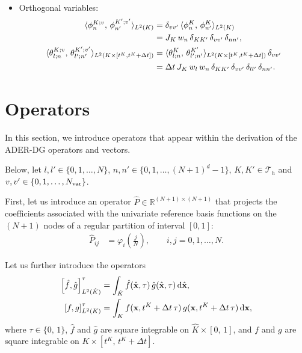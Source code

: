 \documentclass{scrreprt}
\theoremstyle{definition}
\theoremstyle{nonumberplain}
\renewcommand{\vec}[1]{{\textbf{#1}}}
\newcommand{\tria}{\mathcal{T}_h}
\newcommand{\cell}{K}
\newcommand{\dV}{\text{d}\vec{x}}
\newcommand{\refVec}[1]{\hat{\vec{#1}}}
\newcommand{\refCell}{\hat{\cell}}
\newcommand{\detJ}{J_\cell}
\newcommand{\refdV}{\textup{d}\hat{\vec{x}}}
\begin{document}
\begin{itemize}
\item Orthogonal variables:
\begin{align}
\label{eq:ader_impl:basis:orthogonal_variables}
\langle \phi^{\cell;v}_{n},\,\phi^{\cell';v'}_{n'}\rangle_{L^2(\cell)}
&=
\delta_{vv'}\,\langle \phi^{\cell}_{n},\,\phi^{\cell}_{n'}\rangle_{L^2(\cell)}
\notag
\\
&=
\detJ\,
w_{n}\,
\delta_{\cell\cell'}\,
\delta_{vv'}\,
\delta_{n n'},
\\
\label{eq:ader_impl:basis:orthogonal_variables_spacetime}
\langle\theta^{\cell;v}_{l;n},\,\theta^{\cell';v'}_{l';n'}\rangle
_{L^2(\cell\times[t^\cell,t^\cell+\Delta t])}
&=
\langle\theta^{\cell}_{l;n},\,\theta^{\cell'}_{l';n'}\rangle
_{L^2(\cell\times[t^\cell,t^\cell+\Delta t])}\,
\delta_{vv'}
\notag
\\
&= \Delta t\,\detJ\,w_{l}\,w_{n}\,
\delta_{\cell\cell'}\,\delta_{vv'}\,\delta_{l l'}\,\delta_{n n'}.
\end{align}
\end{itemize}
\section{Operators}
In this section, we introduce operators that appear
within the derivation of the ADER-DG
operators and vectors.

Below, let $l,l'\in\{0,1,\ldots,N\}$,
$n,n'\in\{0,1,\ldots,(N+1)^d-1\}$,
$\cell,\cell'\in\tria$ and $v,v'\in\{0,1,\ldots,N_\textup{var}\}$.

First, let us introduce an operator $\hat{P}\in\mathbb{R}^{(N+1)\times(N+1)}$
that projects the coefficients associated
with the univariate reference basis functions on 
the $(N+1)$ nodes of a regular partition of interval $[0,1]$:
\begin{align}
\label{eq:ader_impl:operators:regular_grid_projector_1d}
\hat{P}_{ij} &= \varphi_i \left({\frac{j}{N}}\right),\qquad 
i,j=0,1,\ldots,N.
\end{align}

Let us further introduce the operators
\begin{align}
\left[\hat{f},\hat{g}\right]^{\tau}_{L^2(\refCell)}
&=
\int_{\refCell}
\hat{f}(\refVec{x},\tau)\,\hat{g}(\refVec{x},\tau)\,\refdV,
\\
\left[f,g\right]^{\tau}_{L^2(\cell)}
&=
\int_{\cell}
f(\vec{x},t^K+\Delta t\,\tau)\,g(\vec{x},t^K+\Delta t\,\tau)\,\dV,
\end{align}
where $\tau\in\{0,\,1\}$, $\hat{f}$ and $\hat{g}$ are square integrable on
$\refCell\times[0,\,1]$, and
$f$ and $g$ are square integrable on
$\cell\times[t^\cell,\,t^\cell+\Delta t]$.
\end{document}
